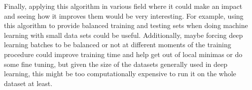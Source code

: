 \documentclass[12pt]{article}
\begin{document}
Finally, applying this algorithm in various field where it could make an impact and seeing how it improves them would be very interesting. For example, using this algorithm to provide balanced training and testing sets when doing machine learning with small data sets could be useful. Additionally, maybe forcing deep learning batches to be balanced or not at different moments of the training procedure could improve training time and help get out of local minimas or do some fine tuning, but given the size of the datasets generally used in deep learning, this might be too computationally expensive to run it on the whole dataset at least.
\newpage


\newpage
\nocite{*}



\end{document}
